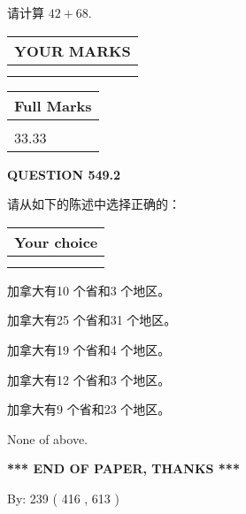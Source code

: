 \documentclass{ctexart}
\begin{document}
  
 
请计算 $ %
42 +  %
68 $.
 

 

 
  
\vspace{0.2in}
  
\noindent\begin{tabular}{|l|}
\hline
 YOUR MARKS  \\
\hline
 \\ 
 \\ 
\hline
\end{tabular}
\hspace{0.05in} \begin{tabular}{|l|}
\hline
 Full Marks  \\
\hline
 \\ 
33.33 \\
\hline
\end{tabular}
{\textbf{\Large{QUESTION
549.2 
}}}
  
  
请从如下的陈述中选择正确的：
  
  
\noindent\hspace{3.0in} \begin{tabular}{|l|}
\hline
Your choice \\
\hline
 \\ 
 \\ 
\hline
\end{tabular}
  
  
 
 
加拿大有10 个省和3 个地区。
 
 
加拿大有25 个省和31 个地区。
 
 
加拿大有19 个省和4 个地区。
 
 
加拿大有12 个省和3 个地区。
 
 
加拿大有9 个省和23 个地区。
 
 
 None of above.
 
 
   
   
 \vspace{0.2in}
 
   
   
   
   
\vspace{1.0in} 
{\textbf{\large{ *** END OF PAPER, THANKS *** }}} 
   
   
\hspace{1.0in} By: 
 239 ( 416 ,  613 )
   
\end{document}
